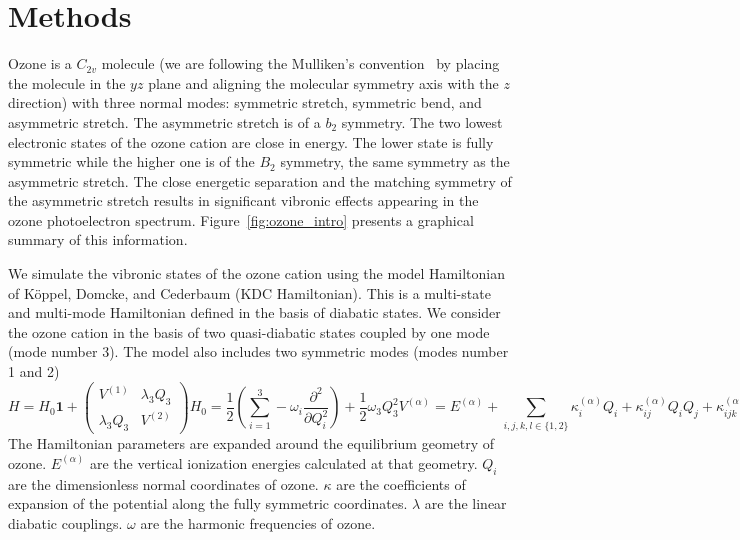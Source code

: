 \documentclass[12pt,pra,aps,superscriptaddress]{revtex4-2}
\begin{document}
\section{Methods}

Ozone is a $C_{2v}$ molecule (we are following the Mulliken's
convention~\cite{Mulliken:55:symnot} by placing the molecule in the $yz$ plane
and aligning the molecular symmetry axis with the $z$ direction) with three
normal modes: symmetric stretch, symmetric bend, and asymmetric stretch.  The
asymmetric stretch is of a $b_2$ symmetry. The two lowest electronic states of
the ozone cation are close in energy. The lower state is fully symmetric while
the higher one is of the $B_2$ symmetry, the same symmetry as the asymmetric
stretch. The close energetic separation and the matching symmetry of the
asymmetric stretch results in significant vibronic effects appearing in the
ozone photoelectron spectrum.  Figure~\ref{fig:ozone_intro} presents a
graphical summary of this information.

We simulate the vibronic states of the ozone cation using the model
Hamiltonian of K{\"o}ppel, Domcke, and Cederbaum (KDC
Hamiltonian).\cite{Cederbaum:LVC:84,KDC:81,Koppel:CIbookCh7:04} This is a
multi-state and multi-mode Hamiltonian defined in the basis of diabatic
states.  We consider the ozone cation in the basis of two quasi-diabatic
states coupled by one mode (mode number 3). The model also includes two
symmetric modes (modes number 1 and 2)
\begin{subequations}
    \begin{equation}
        H = H _0 \mathbf{1}
        +
        \begin{pmatrix}
            V ^{(1)}  & \lambda _3 Q _3\\
            \lambda _3 Q _3 & V ^{(2)}
        \end{pmatrix}
    \end{equation}
    \begin{equation}
        H _0 = 
        \frac{1}{2} \left(\sum _{i = 1}^3 
        - \omega _i \frac{\partial ^2}{\partial Q _i ^2 }\right)
        + \frac{1}{2}\omega _3 Q _3 ^2
    \end{equation}
    \begin{equation}
        V ^{(\alpha)} = 
        E ^{(\alpha)} 
        + \sum _{i,j,k,l \in \{1,2\}} 
            \kappa ^{(\alpha)} _i Q _i 
            + \kappa ^{(\alpha)} _{ij} Q _i Q _j 
            + \kappa ^{(\alpha)} _{ijk} Q _i Q _j Q _k 
            + \kappa ^{(\alpha)} _{ijkl} Q_i Q _j Q _k Q _l.
    \end{equation}
    \label{eq:KDC}
\end{subequations}
The Hamiltonian parameters are expanded around the equilibrium geometry of
ozone. $E ^{(\alpha)}$ are the vertical ionization energies calculated at that
geometry. $Q_i$ are the dimensionless normal coordinates of ozone. $\kappa$ are
the coefficients of expansion of the potential along the fully symmetric
coordinates. $\lambda$ are the linear diabatic couplings.  $\omega$ are the
harmonic frequencies of ozone.
\end{document}
